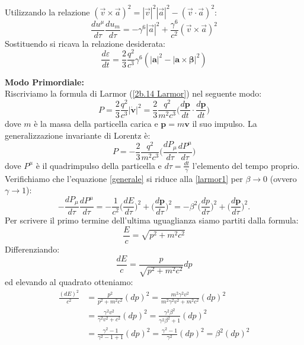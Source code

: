 \documentclass[twoside]{article}
\begin{document}
Utilizzando la relazione $(\vec{v}\times\vec{a})^2=|\vec{v}|^2|\vec{a}|^2-(\vec{v}\cdot\vec{a})^2$:
\begin{equation}
    \frac{du^\mu}{d\tau}\frac{du_m}{d\tau}=-\gamma^6|\vec{a}|^2+\frac{\gamma^6}{c^2}(\vec{v}\times\vec{a})^2
\end{equation}
Sostituendo si ricava la relazione desiderata:
\begin{equation}
     \frac{d\varepsilon}{dt}=\frac{2}{3}\frac{q^2}{c^3} \gamma^6 (|\mathbf{a}|^2-|\mathbf{a}\times\bm{\beta}|^2)
\end{equation}

\textbf{Modo Primordiale:}\\
Riscriviamo la formula di Larmor (\ref{2b.14 Larmor}) nel seguente modo:
\begin{equation} \label{larmor1}
P=\frac{2}{3} \frac{q^2}{c^3} |\mathbf{\dot{v}}|^2=\frac{2}{3} \frac{q^2}{m^2 c^3} \biggl( \frac{d\mathbf{p}}{dt} \cdot \frac{d\mathbf{p}}{dt} \biggr)
\end{equation}
dove $m$ è la massa della particella carica e $\mathbf{p}=m\mathbf{v}$ il suo impulso. La generalizzazione invariante di Lorentz è:
\begin{equation} \label{generale}
P=-\frac{2}{3} \frac{q^2}{m^2 c^3} \biggl( \frac{dP_\mu}{d\tau} \frac{dP^\mu}{d\tau} \biggr)
\end{equation}
dove $P^\mu$ è il quadrimpulso della particella e $d\tau=\frac{dt}{\gamma}$ l'elemento del tempo proprio. Verifichiamo che l'equazione \ref{generale} si riduce alla \ref{larmor1} per $\beta\rightarrow 0$ (ovvero $\gamma \rightarrow 1$):
\begin{equation}
-\frac{dP_\mu}{d\tau} \frac{dP^\mu}{d\tau}=-\frac{1}{c^2} \biggl( \frac{dE}{d\tau} \biggr)^2+\biggl( \frac{d\mathbf{p}}{d\tau}\biggr)^2=-\beta^2 \biggl(\frac{dp}{d\tau}\biggr)^2+\biggl( \frac{d\mathbf{p}}{d\tau}\biggr)^2.
\end{equation}
Per scrivere il primo termine dell'ultima uguaglianza siamo partiti dalla formula:
\begin{equation*}
\frac{E}{c}=\sqrt{p^2+m^2c^2}
\end{equation*}
Differenziando:
\begin{equation*}
\frac{dE}{c}=\frac{p}{\sqrt{p^2+m^2c^2}} dp
\end{equation*}
ed elevando al quadrato otteniamo:
\begin{align*}
\frac{(dE)^2}{c^2}&=\frac{p^2}{p^2+m^2c^2}(dp)^2=\frac{m^2\gamma^2v^2}{m^2\gamma^2v^2+m^2c^2}(dp)^2 \\
&=\frac{\gamma^2v^2}{\gamma^2v^2+c^2}(dp)^2 =\frac{\gamma^2\beta^2}{\gamma^2\beta^2+1}(dp)^2 \\
&=\frac{\gamma^2-1}{\gamma^2-1+1}(dp)^2 =\frac{\gamma^2-1}{\gamma^2}(dp)^2=\beta^2(dp)^2
\end{align*}
\end{document}
